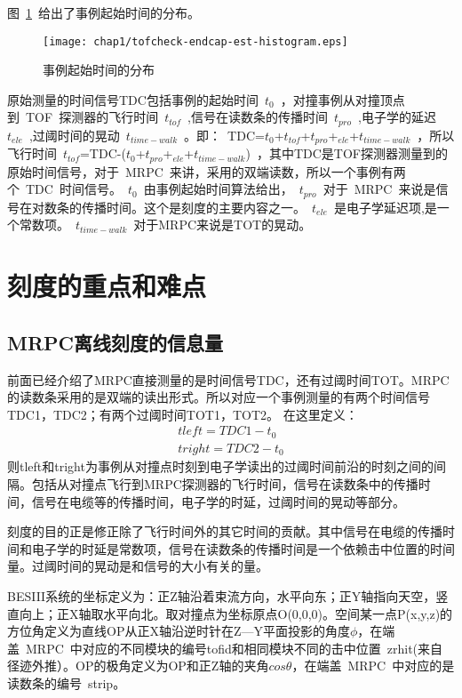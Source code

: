 图~\ref{fig:tofcheck-endcap-est-histogram}~给出了事例起始时间的分布。
\begin{figure}[!h]
  \centering
  \texttt{[image: chap1/tofcheck-endcap-est-histogram.eps]}
  \caption{事例起始时间的分布}
  \label{fig:tofcheck-endcap-est-histogram}
\end{figure}

原始测量的时间信号TDC包括事例的起始时间~$t_{0}$~，对撞事例从对撞顶点到~TOF~探测器的飞行时间~$t_{tof}$~,信号在读数条的传播时间~$t_{pro}$~,电子学的延迟~$t_{ele}$~,过阈时间的晃动~$t_{time-walk}$~。即：~TDC=$t_{0}$+$t_{tof}$+$t_{pro}$+$_{ele}$+$t_{time-walk}$~，所以飞行时间~$t_{tof}$=TDC-($t_{0}$+$t_{pro}$+$_{ele}$+$t_{time-walk}$)~，其中TDC是TOF探测器测量到的原始时间信号，对于~MRPC~来讲，采用的双端读数，所以一个事例有两个~TDC~时间信号。~$t_{0}$~由事例起始时间算法给出，~$t_{pro}$~对于~MRPC~来说是信号在对数条的传播时间。这个是刻度的主要内容之一。~$t_{ele}$~是电子学延迟项,是一个常数项。~$t_{time-walk}$~对于MRPC来说是TOT的晃动。
\section{刻度的重点和难点}
\subsection{MRPC离线刻度的信息量}
前面已经介绍了MRPC直接测量的是时间信号TDC，还有过阈时间TOT。MRPC的读数条采用的是双端的读出形式。所以对应一个事例测量的有两个时间信号TDC1，TDC2；有两个过阈时间TOT1，TOT2。
在这里定义：
\begin{align}
tleft=TDC1-t_{0}
\label{eq:tleft}\\
tright=TDC2-t_{0}
\label{eq:2}
\end{align}
则tleft和tright为事例从对撞点时刻到电子学读出的过阈时间前沿的时刻之间的间隔。包括从对撞点飞行到MRPC探测器的飞行时间，信号在读数条中的传播时间，信号在电缆等的传播时间，电子学的时延，过阈时间的晃动等部分。

刻度的目的正是修正除了飞行时间外的其它时间的贡献。其中信号在电缆的传播时间和电子学的时延是常数项，信号在读数条的传播时间是一个依赖击中位置的时间量。过阈时间的晃动是和信号的大小有关的量。

BESIII系统的坐标定义为：正Z轴沿着束流方向，水平向东；正Y轴指向天空，竖直向上；正X轴取水平向北。取对撞点为坐标原点O(0,0,0)。空间某一点P(x,y,z)的方位角定义为直线OP从正X轴沿逆时针在Z—Y平面投影的角度$\phi$，在端盖~MRPC~中对应的不同模块的编号tofid和相同模块不同的击中位置~zrhit(来自径迹外推）。OP的极角定义为OP和正Z轴的夹角$cos\theta$，在端盖~MRPC~中对应的是读数条的编号~strip。


